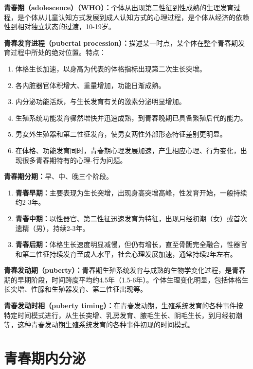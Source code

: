 \begin{defbox}
\textbf{青春期（adolescence）（WHO）：}个体从出现第二性征到性成熟的生理发育过程，是个体从儿童认知方式发展到成人认知方式的心理过程，是个体从经济的依赖性到相对独立状态的过渡，10-19岁。

\textbf{青春发育进程（pubertal procession）：}描述某一时点，某个体在整个青春期发育过程中所处的绝对位置。特点：
\begin{enumerate}[leftmargin=*]
    \item 体格生长加速，以身高为代表的体格指标出现第二次生长突增。
    \item 各内脏器官体积增大、重量增加，功能日渐成熟。
    \item 内分泌功能活跃，与生长发育有关的激素分泌明显增加。
    \item 生殖系统功能发育骤然增快并迅速成熟，到青春晚期已具备繁殖后代的能力。
    \item 男女外生殖器和第二性征发育，使男女两性外部形态特征差别更明显。
    \item 在体格、功能发育同时，青春期心理发展加速，产生相应心理、行为变化，出现很多青春期特有的心理-行为问题。
\end{enumerate}

\textbf{青春期分期：}早、中、晚三个阶段。
\begin{enumerate}[leftmargin=*]
    \item \textbf{青春早期：}主要表现为生长突增，出现身高突增高峰，性发育开始，一般持续约2-3年。
    \item \textbf{青春中期：}以性器官、第二性征迅速发育为特征，出现月经初潮（女）或首次遗精（男），持续2-3年。
    \item \textbf{青春后期：}体格生长速度明显减慢，但仍有增长，直至骨骺完全融合，性器官和第二性征持续发育至成人水平，社会心理发展加速，通常持续2年左右。
\end{enumerate}

\textbf{青春发动期（puberty）：}青春期生殖系统发育与成熟的生物学变化过程，是青春期的早期阶段，时间跨度平均约4.5年（1.5-6年）。个体生理变化明显，包括体格生长突增、性腺和生殖器发育、第二性征出现等。

\textbf{青春发动时相（puberty timing）：}在青春发动期，生殖系统发育的各种事件按特定时间模式进行，从生长突增、乳房发育、腋毛生长、阴毛生长，到月经初潮等，这种青春发动期生殖系统发育的各种事件初现的时间模式。
\end{defbox}

\section{青春期内分泌}


